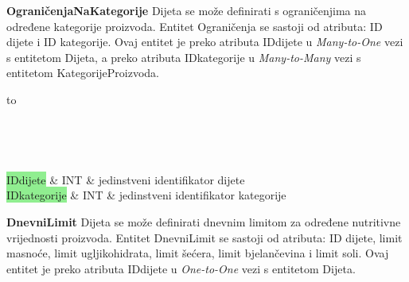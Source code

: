 				\textbf{OgraničenjaNaKategorije} Dijeta se može definirati s ograničenjima na određene kategorije proizvoda. Entitet Ograničenja se sastoji od atributa: ID dijete i ID kategorije. Ovaj entitet je preko atributa IDdijete u \textit{Many-to-One} vezi s entitetom Dijeta, a preko atributa IDkategorije u \textit{Many-to-Many} vezi s entitetom KategorijeProizvoda.
				
				\begin{longtabu} to \textwidth {|X[7, l]|X[6, l]|X[20, l]|}
					
					\hline {}	 \\[3pt] \hline
					\endfirsthead
					
					\hline {}	 \\[3pt] \hline
					\endhead
					
					\hline 
					\endlastfoot
					
					\colorbox{LightGreen}{IDdijete} & INT	&  jedinstveni identifikator dijete \\ \hline
					\colorbox{LightGreen}{IDkategorije} & INT & jedinstveni identifikator kategorije\\ \hline
					
				\end{longtabu}
				
				\textbf{DnevniLimit} Dijeta se može definirati dnevnim limitom za određene nutritivne vrijednosti proizvoda. Entitet DnevniLimit se sastoji od atributa: ID dijete, limit masnoće, limit ugljikohidrata, limit šećera, limit bjelančevina i limit soli. Ovaj entitet je preko atributa IDdijete u \textit{One-to-One} vezi s entitetom Dijeta.
				
